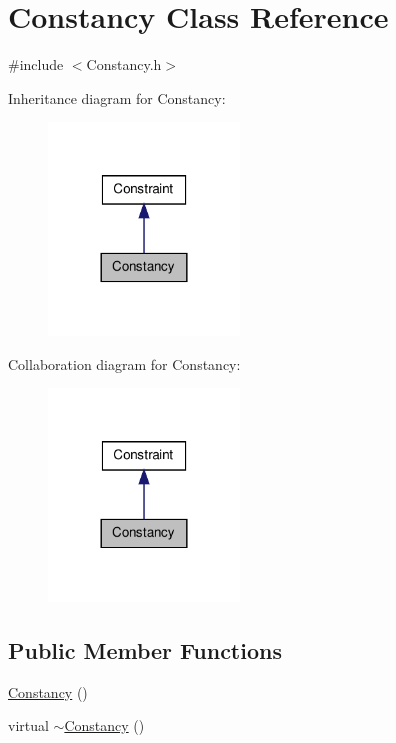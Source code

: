 \hypertarget{classConstancy}{\section{\-Constancy \-Class \-Reference}
\label{classConstancy}
}


{\ttfamily \#include $<$\-Constancy.\-h$>$}



\-Inheritance diagram for \-Constancy\-:
\nopagebreak
\begin{figure}[H]
\begin{center}
\leavevmode
\includegraphics[width=144pt]{classConstancy__inherit__graph}
\end{center}
\end{figure}


\-Collaboration diagram for \-Constancy\-:
\nopagebreak
\begin{figure}[H]
\begin{center}
\leavevmode
\includegraphics[width=144pt]{classConstancy__coll__graph}
\end{center}
\end{figure}
\subsection*{\-Public \-Member \-Functions}
\begin{DoxyCompactItemize}
\item 
\hyperlink{classConstancy_ae38922343ad8a98bd4e501e8ada5c83c}{\-Constancy} ()
\item 
virtual \hyperlink{classConstancy_a1cc620e04f04b406913bc60fd883bd66}{$\sim$\-Constancy} ()
\end{DoxyCompactItemize}
